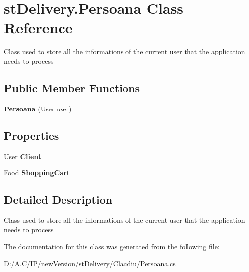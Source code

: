 \hypertarget{classst_delivery_1_1_persoana}{}\section{st\+Delivery.\+Persoana Class Reference}
\label{classst_delivery_1_1_persoana}


Class used to store all the informations of the current user that the application needs to process  


\subsection*{Public Member Functions}
\begin{DoxyCompactItemize}
\item 
\mbox{\label{classst_delivery_1_1_persoana_a746da8d518991da335d9c8fb64336ce3}} 
{\bfseries Persoana} (\hyperlink{classst_delivery_1_1_user}{User} user)
\end{DoxyCompactItemize}
\subsection*{Properties}
\begin{DoxyCompactItemize}
\item 
\mbox{\label{classst_delivery_1_1_persoana_a516c65b4a4d6888c4948a0201c6ccb56}} 
\hyperlink{classst_delivery_1_1_user}{User} {\bfseries Client}
\item 
\mbox{\label{classst_delivery_1_1_persoana_a044eff8ab287daf1350f1ecb39b90c3b}} 
\hyperlink{classst_delivery_1_1_kitchen_1_1_food}{Food} {\bfseries Shopping\+Cart}
\end{DoxyCompactItemize}


\subsection{Detailed Description}
Class used to store all the informations of the current user that the application needs to process 



The documentation for this class was generated from the following file\+:\begin{DoxyCompactItemize}
\item 
D\+:/\+A.\+C/\+I\+P/new\+Version/st\+Delivery/\+Claudiu/Persoana.\+cs\end{DoxyCompactItemize}
